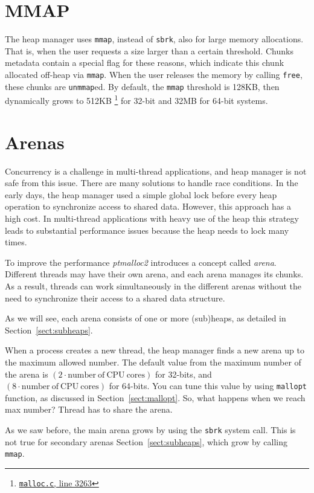 \documentclass{masterthesis}
\newcommand*\mmapc{\lstinline{mmap}\xspace}
\newcommand*\sbrkc{\lstinline{sbrk}\xspace}
\newcommand{\refToSection}[1]{Section~\ref{sect:#1}\xspace}
\begin{document}
\section{MMAP}
\label{sect:mmap}
The heap manager uses \mmapc{}, instead of \sbrkc, also for large memory allocations. That is, when the user requests a size larger than a certain threshold. Chunks metadata contain a special flag for these reasons, which indicate this chunk allocated off-heap via \mmapc{}. When the user releases the memory by calling \lstinline{free}, these chunks are \lstinline{unmmap}ed. By default, the \mmapc{} threshold is 128KB, then dynamically grows to 512KB \footnote{\href{https://sourceware.org/git/?p=glibc.git;a=blob;f=malloc/malloc.c;\#l3263}{\texttt{malloc.c}, line 3263}} for 32-bit and 32MB for 64-bit systems.

\section{Arenas}
\label{sect:arena}
Concurrency is a challenge in multi-thread applications, and heap manager is not safe from this issue. There are many solutions to handle race conditions. In the early days, the heap manager used a simple global lock before every heap operation to synchronize access to shared data. However, this approach has a high cost. In multi-thread applications with heavy use of the heap this strategy leads to substantial performance issues because the heap needs to lock many times.

To improve the performance \emph{ptmalloc2} introduces a concept called \emph{arena}. Different threads may have their own arena, and each arena manages its chunks. As a result, threads can work simultaneously in the different arenas without the need to synchronize their access to a shared data structure.

As we will see, each arena consists of one or more (sub)heaps, as detailed in \refToSection{subheaps}.

When a process creates a new thread, the heap manager finds a new arena up to the maximum allowed number. The default value from the maximum number of the arena is $(2\cdot\mathrm{number\ of\ CPU\ cores})$ for 32-bits, and $(8\cdot\mathrm{number\ of\ CPU\ cores})$ for 64-bits. You can tune this value by using \lstinline{mallopt} function, as discussed in \refToSection{mallopt}. So, what happens when we reach max number? Thread has to share the arena.

As we saw before, the main arena grows by using the \sbrkc system call. This is not true for secondary arenas \refToSection{subheaps}, which grow by calling \mmapc{}.
\end{document}
